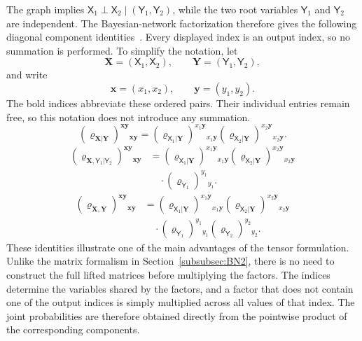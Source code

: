 \documentclass[
    aps,
    pra,
    reprint,
    superscriptaddress,
    nofootinbib
]{revtex4-2}
\theoremstyle{definition}
\theoremstyle{plain}
\begin{document}
The graph implies
$\mathsf{X}_{1}\perp\mathsf{X}_{2}
\mid(\mathsf{Y}_{1},\mathsf{Y}_{2})$, while the two root variables
$\mathsf{Y}_{1}$ and $\mathsf{Y}_{2}$ are independent. The
Bayesian-network factorization therefore gives the following diagonal
component identities~\cite[Sec.~11.2.3, Eq.~(11.3)]{Darwiche2008}.
Every displayed index is an output index, so no summation is performed.
To simplify the notation, let
\begin{equation}
    \mathbf{X}=(\mathsf{X}_{1},\mathsf{X}_{2}),
    \qquad
    \mathbf{Y}=(\mathsf{Y}_{1},\mathsf{Y}_{2}),
\end{equation}
and write
\begin{equation}
    \mathbf{x}=(x_{1},x_{2}),
    \qquad
    \mathbf{y}=(y_{1},y_{2}).
\end{equation}
The bold indices abbreviate these ordered pairs. Their individual entries
remain free, so this notation does not introduce any summation.
\begin{equation}
    (\varrho_{\mathbf{X}|\mathbf{Y}})
    ^{\mathbf{x}\mathbf{y}}{}_{\mathbf{x}\mathbf{y}}
    =
    (\varrho_{\mathsf{X}_{1}|\mathbf{Y}})
    ^{x_{1}\mathbf{y}}{}_{x_{1}\mathbf{y}}
    (\varrho_{\mathsf{X}_{2}|\mathbf{Y}})
    ^{x_{2}\mathbf{y}}{}_{x_{2}\mathbf{y}}.
\end{equation}
\begin{equation}
    \begin{aligned}
    (\varrho_{\mathbf{X},\mathsf{Y}_{1}|\mathsf{Y}_{2}})
    ^{\mathbf{x}\mathbf{y}}{}_{\mathbf{x}\mathbf{y}}
    &=
    (\varrho_{\mathsf{X}_{1}|\mathbf{Y}})
    ^{x_{1}\mathbf{y}}{}_{x_{1}\mathbf{y}}
    (\varrho_{\mathsf{X}_{2}|\mathbf{Y}})
    ^{x_{2}\mathbf{y}}{}_{x_{2}\mathbf{y}}\\
    &\quad\cdot
    (\varrho_{\mathsf{Y}_{1}})^{y_{1}}{}_{y_{1}}.
    \end{aligned}
\end{equation}
\begin{equation}
    \begin{aligned}
    (\varrho_{\mathbf{X},\mathbf{Y}})
    ^{\mathbf{x}\mathbf{y}}{}_{\mathbf{x}\mathbf{y}}
    &=
    (\varrho_{\mathsf{X}_{1}|\mathbf{Y}})
    ^{x_{1}\mathbf{y}}{}_{x_{1}\mathbf{y}}
    (\varrho_{\mathsf{X}_{2}|\mathbf{Y}})
    ^{x_{2}\mathbf{y}}{}_{x_{2}\mathbf{y}}\\
    &\quad\cdot
    (\varrho_{\mathsf{Y}_{1}})^{y_{1}}{}_{y_{1}}
    (\varrho_{\mathsf{Y}_{2}})^{y_{2}}{}_{y_{2}}.
    \end{aligned}
\end{equation}
These identities illustrate one of the main advantages of the tensor
formulation. Unlike the matrix formalism in
Section~\ref{subsubsec:BN2}, there is no need to construct the full
lifted matrices before multiplying the factors. The indices determine
the variables shared by the factors, and a factor that does not contain
one of the output indices is simply multiplied across all values of that
index. The joint probabilities are therefore obtained directly from the
pointwise product of the corresponding components.
\end{document}
